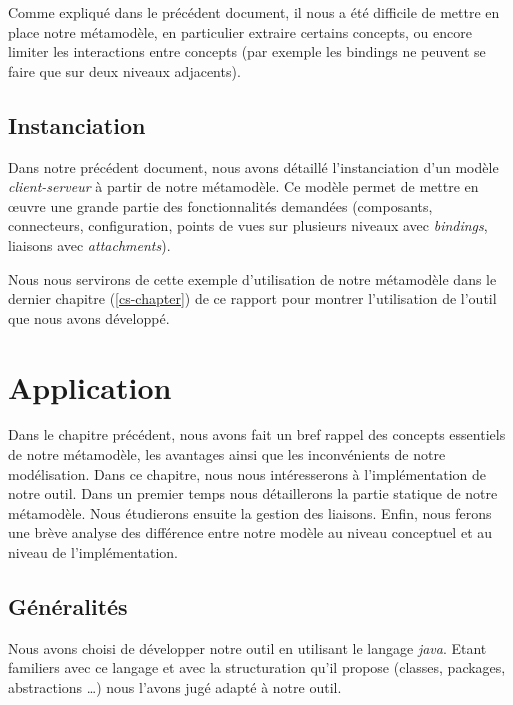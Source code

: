         Comme expliqué dans le précédent document, il nous a été difficile de mettre en place notre métamodèle, en particulier extraire certains concepts, ou encore limiter les interactions entre concepts (par exemple les bindings ne peuvent se faire que sur deux niveaux adjacents).
        
	\section{Instanciation}
    	Dans notre précédent document, nous avons détaillé l'instanciation d'un modèle \emph{client-serveur} à partir de notre métamodèle. Ce modèle permet de mettre en \oe{}uvre une grande partie des fonctionnalités demandées (composants, connecteurs, configuration, points de vues sur plusieurs niveaux avec \emph{bindings}, liaisons avec \emph{attachments}).
        \newline
        
        Nous nous servirons de cette exemple d'utilisation de notre métamodèle dans le dernier chapitre (\ref{cs-chapter}) de ce rapport pour montrer l'utilisation de l'outil que nous avons développé.
        
\chapter{Application}
\label{application-chapter}

	Dans le chapitre précédent, nous avons fait un bref rappel des concepts essentiels de notre métamodèle, les avantages ainsi que les inconvénients de notre modélisation. Dans ce chapitre, nous nous intéresserons à l'implémentation de notre outil. Dans un premier temps nous détaillerons la partie statique de notre métamodèle. Nous étudierons ensuite la gestion des liaisons. Enfin, nous ferons une brève analyse des différence entre notre modèle au niveau conceptuel et au niveau de l'implémentation.
    
    \section{Généralités}
      Nous avons choisi de développer notre outil en utilisant le langage \emph{java}. Etant familiers avec ce langage et avec la structuration qu'il propose (classes, packages, abstractions \ldots) nous l'avons jugé adapté à notre outil.
      \newline
      
